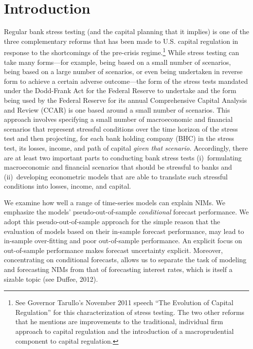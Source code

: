 \documentclass[11pt]{article}
\renewcommand{\baselinestretch}{1.5}
\begin{document}
\newpage
\setcounter{page}{1}

\section{Introduction}

\vspace{-0.1in}
Regular bank stress testing (and the capital planning that it implies) is one of the three complementary reforms that has been made to U.S. capital regulation in response to the shortcomings of the pre-crisis regime.\renewcommand{\baselinestretch}{1}\footnote{See Governor Tarullo's November 2011 speech ``The Evolution of Capital Regulation'' for this characterization of stress testing. The two other reforms that he mentions are improvements to the traditional, individual firm approach to capital regulation and the introduction of a macroprudential component to capital regulation.\vspace{0.05in}}\renewcommand{\baselinestretch}{1.5} While stress testing can take many forms---for example, being based on a small number of scenarios, being based on a large number of scenarios, or even being undertaken in reverse form to achieve a certain adverse outcome---the form of the stress tests mandated under the Dodd-Frank Act for the Federal Reserve to undertake and the form being used by the Federal Reserve for its annual Comprehensive Capital Analysis and Review (CCAR) is one based around a small number of scenarios.  This approach involves specifying a small number of macroeconomic and financial scenarios that represent stressful conditions over the time horizon of the stress test and then projecting, for each bank holding company (BHC) in the stress test, its losses, income, and path of capital \textit{given that scenario}. Accordingly, there are at least two important parts to conducting bank stress tests (i)~formulating macroeconomic and financial scenarios that should be stressful to banks and (ii)~developing econometric models that are able to translate such stressful conditions into losses, income, and capital.

We examine how well a range of time-series models can explain NIMs. We emphasize the models' pseudo-out-of-sample \textit{conditional} forecast performance. We adopt this pseudo-out-of-sample approach for the simple reason that the evaluation of models based on their in-sample forecast performance, may lead to in-sample over-fitting and poor out-of-sample performance. An explicit focus on out-of-sample performance makes forecast uncertainty explicit.
Moreover, concentrating on conditional forecasts, allows us to separate the task of modeling and forecasting NIMs from that of forecasting interest rates, which is itself a sizable topic (see Duffee, 2012).
\end{document}
